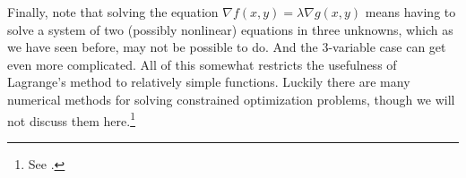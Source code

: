 Finally, note that solving the equation $\nabla f(x,y) = \lambda \nabla g(x,y)$ means having to solve a system of two (possibly nonlinear) equations in three unknowns, which as we have seen before, may not be possible to do. And the 3-variable case can get even more complicated. All of this somewhat restricts the usefulness of Lagrange's method to relatively simple functions. Luckily there are many numerical methods for solving constrained optimization problems, though we will not discuss them here.\footnote{See \cite{bss}.}

